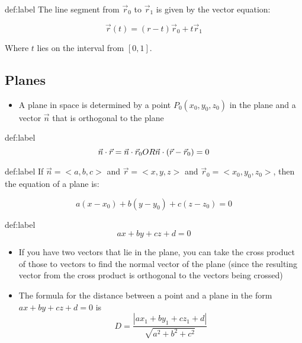 \documentclass{package/notes}
\begin{document}
\begin{definition}{def:label}
	The line segment from $\vec r_0$ to $\vec r_1$ is given by the vector equation:

	$$\vec r(t) = (r-t)\vec r_0 + t\vec r_1$$

	Where $t$ lies on the interval from $[0,1]$.
\end{definition} %

\subsection{Planes}

\begin{itemize}
	\item A plane in space is determined by a point $P_0(x_0,y_0,z_0)$ in the plane and a vector $\vec n$ that is orthogonal to the plane
\end{itemize}

\begin{definition}{def:label}
	$$
	\vec n \cdot \vec r = \vec n \cdot \vec r_0\\
	OR\\
	\vec n \cdot (\vec r - \vec r_0) = 0
	$$
\end{definition} %

\begin{definition}{def:label}
	If $\vec n = <a,b,c>$ and $\vec r = <x,y,z>$ and $\vec r_0 = <x_0,y_0,z_0>$, then the equation  of a plane is:

	$$a(x-x_0) +b(y-y_0)+c(z-z_0) = 0$$
\end{definition}

\begin{definition}{def:label}
	$$ax +by+cz+d=0$$
\end{definition}

\begin{itemize}
	\item If you have two vectors that lie in the plane, you can take the cross product of those to vectors to find the normal vector of the plane (since the resulting vector from the cross product is orthogonal to 	the vectors being crossed)
	\item The formula for the distance between a point and a plane in the form $ax+by+cz+d=0$ is 
	$$
	D = \frac{|ax_1+by_1+cz_1+d|}{\sqrt{a^2+b^2+c^2}}
	$$
\end{itemize}
\end{document}
